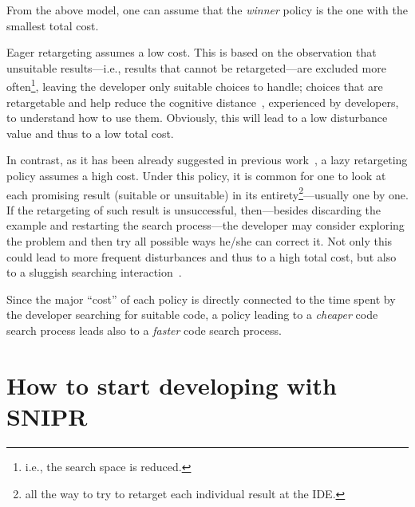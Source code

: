 From the above model, one can assume that the \emph{winner} policy is the one with the smallest total cost.

Eager retargeting assumes a low cost. This is based on the observation that unsuitable results---i.e., results that cannot be retargeted---are excluded more often\footnote{i.e., the search space is reduced.}, leaving the developer only suitable choices to handle; choices that are retargetable and help reduce the cognitive distance~\cite{Krueger:1992wf}, experienced by developers, to understand how to use them. Obviously, this will lead to a low disturbance value and thus to a low total cost.  

In contrast, as it has been already suggested in previous work~\cite{Brandt:2009ew, Wightman:2012gc}, a lazy retargeting policy assumes a high cost. Under this policy, it is common for one to look at each promising result (suitable or unsuitable) in its entirety\footnote{all the way to try to retarget each individual result at the IDE.}---usually one by one. If the retargeting of such result is unsuccessful, then---besides discarding the example and restarting the search process---the developer may consider exploring the problem and then try all possible ways he/she can correct it. Not only this could lead to more frequent disturbances and thus to a high total cost, but also to a sluggish searching interaction~\cite{Gray:2000im}.

Since the major ``cost'' of each policy is directly connected to the time spent by the developer searching for suitable code, a policy leading to a \emph{cheaper} code search process leads also to a \emph{faster} code search process.

% 
% 
% 


\section{How to start developing with \uppercase{SnipR}}
\label{sec:sniprscenario}

